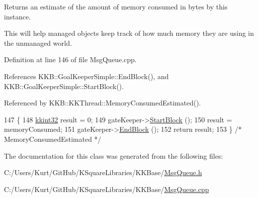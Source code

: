 Returns an estimate of the amount of memory consumed in bytes by this instance. 

This will help managed objects keep track of how much memory they are using in the unmanaged world. 

Definition at line 146 of file Msg\+Queue.\+cpp.



References K\+K\+B\+::\+Goal\+Keeper\+Simple\+::\+End\+Block(), and K\+K\+B\+::\+Goal\+Keeper\+Simple\+::\+Start\+Block().



Referenced by K\+K\+B\+::\+K\+K\+Thread\+::\+Memory\+Consumed\+Estimated().


\begin{DoxyCode}
147 \{
148   \hyperlink{namespace_k_k_b_a8fa4952cc84fda1de4bec1fbdd8d5b1b}{kkint32}  result = 0;
149   gateKeeper->\hyperlink{class_k_k_b_1_1_goal_keeper_simple_aa8bcf9dcd7f07275aaac8ecdedac8cb1}{StartBlock} ();
150   result = memoryConsumed;
151   gateKeeper->\hyperlink{class_k_k_b_1_1_goal_keeper_simple_a28a529882f7ace4f8300508d4dee9c3e}{EndBlock} ();
152   \textcolor{keywordflow}{return}  result;
153 \}  \textcolor{comment}{/* MemoryConsumedEstimated */}
\end{DoxyCode}


The documentation for this class was generated from the following files\+:\begin{DoxyCompactItemize}
\item 
C\+:/\+Users/\+Kurt/\+Git\+Hub/\+K\+Square\+Libraries/\+K\+K\+Base/\hyperlink{_msg_queue_8h}{Msg\+Queue.\+h}\item 
C\+:/\+Users/\+Kurt/\+Git\+Hub/\+K\+Square\+Libraries/\+K\+K\+Base/\hyperlink{_msg_queue_8cpp}{Msg\+Queue.\+cpp}\end{DoxyCompactItemize}
